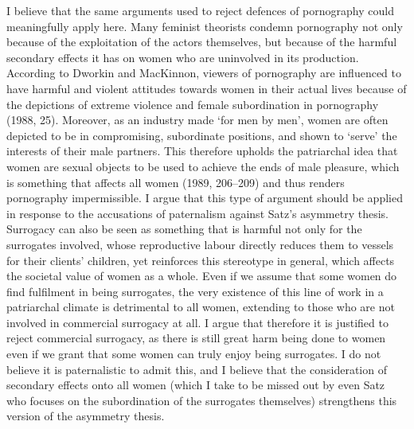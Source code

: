 I believe that the same arguments used
to reject defences of pornography could meaningfully apply here. Many
feminist theorists condemn pornography not only because of the
exploitation of the actors themselves, but because of the harmful
secondary effects it has on women who are uninvolved in its production.
According to Dworkin and MacKinnon, viewers of pornography are
influenced to have harmful and violent attitudes towards women in their
actual lives because of the depictions of extreme violence and female
subordination in pornography (1988, 25). Moreover, as an industry made
`for men by men', women are often depicted to be in compromising,
subordinate positions, and shown to `serve' the interests of their male
partners. This therefore upholds the patriarchal idea that women are
sexual objects to be used to achieve the ends of male pleasure, which is
something that affects all women (1989, 206--209) and thus renders
pornography impermissible. I argue that this type of argument should be
applied in response to the accusations of paternalism against Satz's
asymmetry thesis. Surrogacy can also be seen as something that is
harmful not only for the surrogates involved, whose reproductive labour
directly reduces them to vessels for their clients' children, yet
reinforces this stereotype in general, which affects the societal value
of women as a whole. Even if we assume that some women do find
fulfilment in being surrogates, the very existence of this line of work
in a patriarchal climate is detrimental to all women, extending to those
who are not involved in commercial surrogacy at all. I argue that
therefore it is justified to reject commercial surrogacy, as there is
still great harm being done to women even if we grant that some women
can truly enjoy being surrogates. I do not believe it is paternalistic
to admit this, and I believe that the consideration of secondary effects
onto all women (which I take to be missed out by even Satz who focuses
on the subordination of the surrogates themselves) strengthens this
version of the asymmetry thesis. 

